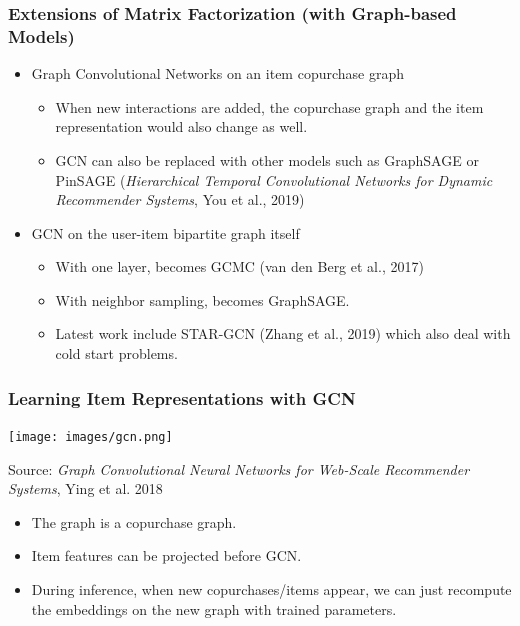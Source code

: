 \documentclass[11pt,aspectratio=169]{beamer}
\begin{document}
	\begin{frame}
		\frametitle{Extensions of Matrix Factorization \tiny (with Graph-based Models)}
		\begin{itemize}
			\item Graph Convolutional Networks on an item copurchase graph
			\begin{itemize}
				\item When new interactions are added, the copurchase graph and the item representation would also change as well.
				\item GCN can also be replaced with other models such as GraphSAGE or PinSAGE (\textit{Hierarchical Temporal Convolutional Networks for Dynamic Recommender Systems}, You et al., 2019)
			\end{itemize}
			\item GCN on the user-item bipartite graph itself
			\begin{itemize}
				\item With one layer, becomes GCMC (van den Berg et al., 2017)
				\item With neighbor sampling, becomes GraphSAGE.
				\item Latest work include STAR-GCN (Zhang et al., 2019) which also deal with cold start problems.
			\end{itemize}
		\end{itemize}
	\end{frame}

	\begin{frame}
		\frametitle{Learning Item Representations with GCN}
		\begin{center}
			\centering
			\texttt{[image: images/gcn.png]}
			
			{\tiny Source: \textit{Graph Convolutional Neural Networks for Web-Scale Recommender Systems}, Ying et al. 2018}
		\end{center}
		\begin{itemize}
			\item<1-> The graph is a copurchase graph.
			\item<2-> Item features can be projected before GCN.
			\item<3-> During inference, when new copurchases/items appear, we can just recompute the embeddings on the new graph with trained parameters.
		\end{itemize}
	\end{frame}
\end{document}
